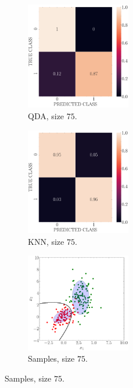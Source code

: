 \documentclass[12pt, a4 paper]{article}
\begin{document}
\begin{figure}[!htbp]
\quad \quad 
    \begin{subfigure}[!htbp]{0.24\textwidth}
       \centering
       \includegraphics[width=1.8in]{../results/ex1/conf_mtx_QD_ML_dataset_P1b_size_75.pdf}
       \caption{QDA, size $75$.}
       \label{fig:KNN_P1b_75}
    \end{subfigure}
\quad \quad   
    \begin{subfigure}[!htbp]{0.24\textwidth}
       \centering
       \includegraphics[width=1.8in]{../results/ex1/conf_mtx_KNN_dataset_P1b_size_75.pdf}
       \caption{KNN, size $75$.}
       \label{fig:KNN_P1b_75}
    \end{subfigure}
\quad \quad
    \begin{subfigure}[!htbp]{0.24\textwidth}
       \centering
       \includegraphics[width=1.8in]{../results/ex1/samples_QD_ML_dataset_P1b_size_75.pdf}
       \caption{Samples, size $75$.}
       \label{fig:KNN_P1b_75}
    \end{subfigure}
    

\end{figure}
\end{document}
